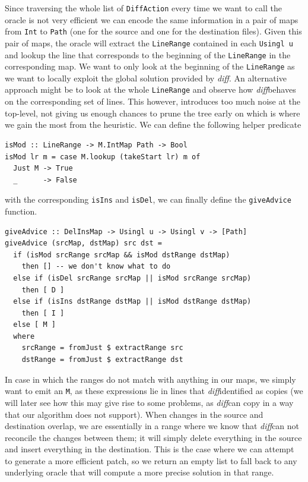 \documentclass[11pt, titlepage]{article}
\newcommand{\toHaskell}[1]{\texttt{#1}\xspace}
\newcommand{\diff}{\emph{diff}}
\begin{document}
Since traversing the whole list of \toHaskell{DiffAction} every time we want to call the oracle is not very efficient we can encode the same information in a pair of maps from \toHaskell{Int} to \toHaskell{Path} (one for the source and one for the destination files). 
Given this pair of maps, the oracle will extract the \toHaskell{LineRange} contained in each \toHaskell{Usingl u} and lookup the line that corresponds to the beginning of the \toHaskell{LineRange} in the corresponding map. We want to only look at the beginning of the \toHaskell{LineRange} as we want to locally exploit the global solution provided by \diff. An alternative approach might be to look at the whole \toHaskell{LineRange} and observe how \diff behaves on the corresponding set of lines. This however, introduces too much noise at the top-level, not giving us enough chances to prune the tree early on which is where we gain the most from the heuristic.
We can define the following helper predicate

\begin{verbatim}
isMod :: LineRange -> M.IntMap Path -> Bool
isMod lr m = case M.lookup (takeStart lr) m of
  Just M -> True
  _      -> False
\end{verbatim}

with the corresponding \toHaskell{isIns} and \toHaskell{isDel}, we can finally define the \toHaskell{giveAdvice} function.

\begin{verbatim}
giveAdvice :: DelInsMap -> Usingl u -> Usingl v -> [Path]
giveAdvice (srcMap, dstMap) src dst =
  if (isMod srcRange srcMap && isMod dstRange dstMap)
    then [] -- we don't know what to do
  else if (isDel srcRange srcMap || isMod srcRange srcMap)
    then [ D ]
  else if (isIns dstRange dstMap || isMod dstRange dstMap)
    then [ I ]
  else [ M ]
  where
    srcRange = fromJust $ extractRange src
    dstRange = fromJust $ extractRange dst
\end{verbatim}

In case in which the ranges do not match with anything in our maps, we simply want to emit an \toHaskell{M}, as these expressions lie in lines that \diff identified as copies (we will later see how this may give rise to some problems, as \diff can copy in a way that our algorithm does not support). 
When changes in the source and destination overlap, we are essentially in a range where we know that \diff can not reconcile the changes between them; it will simply delete everything in the source and insert everything in the destination. 
This is the case where we can attempt to generate a more efficient patch, so we return an empty list to fall back to any underlying oracle that will compute a more precise solution in that range. 
\end{document}
